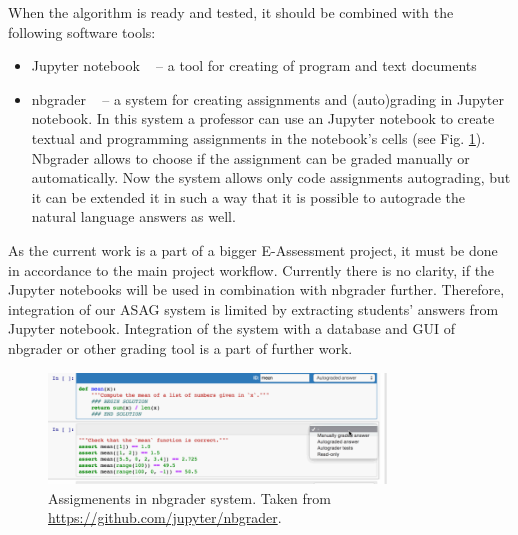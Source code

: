 When the algorithm is ready and tested, it should be combined with the following software tools:
\begin{itemize}
\item Jupyter notebook ~\cite{ipython} -- a tool for creating of program and text documents
\item nbgrader ~\cite{nbgrader} -- a system for creating assignments and (auto)grading in Jupyter notebook. In this system a professor can use an Jupyter notebook to create textual and programming assignments in the notebook's cells (see Fig. \ref{fig:nbgrader}). Nbgrader allows to choose if the assignment can be graded manually or automatically.  Now the system allows only code assignments autograding, but it can be extended it in such a way that it is possible to autograde the natural language answers as well.
\end{itemize}

As the current work is a part of a bigger E-Assessment project, it must be done in accordance to the main project workflow. Currently there is no clarity, if the Jupyter notebooks will be used in combination with nbgrader further. Therefore, integration of our ASAG system is limited by extracting students' answers from Jupyter notebook. Integration of the system with a database and GUI of nbgrader or other grading tool is a part of further work.

\begin{figure}[h!]
  \centering
  \includegraphics[width=0.8\textwidth]{img/nbgrader}
    \caption{Assigmenents in nbgrader system. Taken from \url{https://github.com/jupyter/nbgrader}.\label{fig:nbgrader}}
\end{figure}